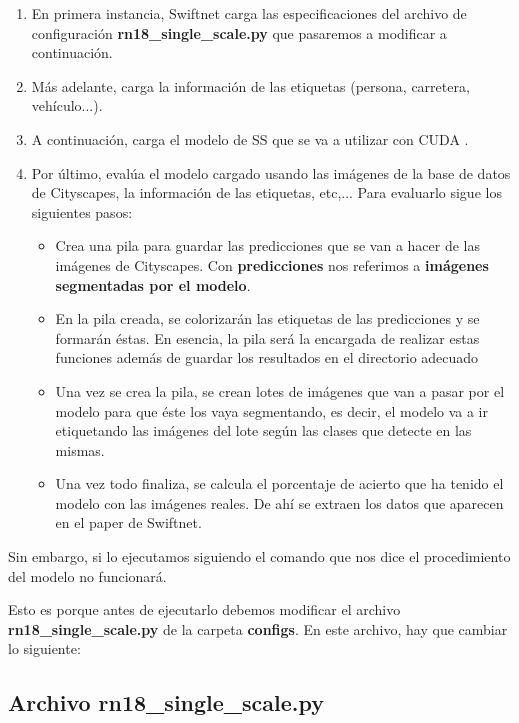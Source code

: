 \begin{enumerate}
\item En primera instancia, Swiftnet carga las especificaciones del archivo de configuración \textbf{rn18\_single\_scale.py} que pasaremos a modificar a continuación.
\item Más adelante, carga la información de las etiquetas (persona, carretera, vehículo...).
\item A continuación, carga el modelo de \ac{SS} que se va a utilizar con CUDA \cite{cuda}.
\item Por último, evalúa el modelo cargado usando las imágenes de la base de datos de Cityscapes, la información de las etiquetas, etc,... Para evaluarlo sigue los siguientes pasos:

\begin{itemize}
\item Crea una pila para guardar las predicciones que se van a hacer de las imágenes de Cityscapes. Con \textbf{predicciones} nos referimos a \textbf{imágenes segmentadas por el modelo}.
\item En la pila creada, se colorizarán las etiquetas de las predicciones y se formarán éstas. En esencia, la pila será la encargada de realizar estas funciones además de guardar los resultados en el directorio adecuado
\item Una vez se crea la pila, se crean lotes de imágenes que van a pasar por el modelo para que éste los vaya segmentando, es decir, el modelo va a ir etiquetando las imágenes del lote según las clases que detecte en las mismas.
\item Una vez todo finaliza, se calcula el porcentaje de acierto que ha tenido el modelo con las imágenes reales. De ahí se extraen los datos que aparecen en el paper de Swiftnet.
\end{itemize}   
\end{enumerate}

Sin embargo, si lo ejecutamos siguiendo el comando que nos dice el procedimiento del modelo no funcionará.

Esto es porque antes de ejecutarlo debemos modificar el archivo \textbf{rn18\_single\_scale.py} de la carpeta \textbf{configs}. En este archivo, hay que cambiar lo siguiente:

\subsection{Archivo rn18\_single\_scale.py}


